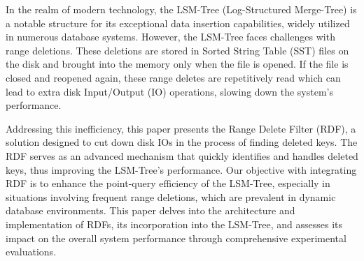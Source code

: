 
In the realm of modern technology, the LSM-Tree (Log-Structured Merge-Tree) is a notable structure for its exceptional data insertion capabilities, widely utilized in numerous database systems. However, the LSM-Tree faces  challenges with range deletions. These deletions are stored in Sorted String Table (SST) files on the disk and brought into the memory only when the file is opened. If the file is closed and reopened  again, these range deletes are repetitively read which can lead to extra disk Input/Output (IO) operations, slowing down the system's performance.

Addressing this inefficiency, this paper presents the Range Delete Filter (RDF), a  solution designed to  cut down disk IOs in the process of finding deleted keys. The RDF serves as an advanced mechanism that quickly identifies and handles deleted keys, thus improving the LSM-Tree's performance. Our objective with integrating RDF is to enhance the point-query efficiency of the LSM-Tree, especially in situations involving frequent range deletions, which are prevalent in dynamic database environments. This paper delves into the architecture and implementation of RDFs, its incorporation into the LSM-Tree, and assesses its impact on the overall system performance through comprehensive experimental evaluations.